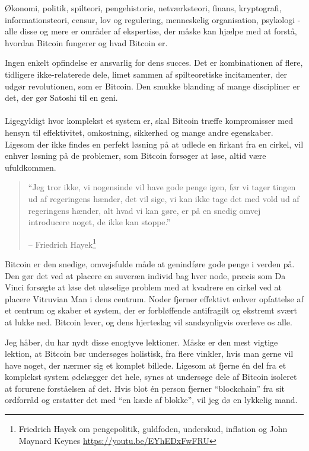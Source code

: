 Økonomi, politik, spilteori, pengehistorie, netværksteori, finans, kryptografi, 
informationsteori, censur, lov og regulering, menneskelig organisation, 
psykologi - alle disse og mere er områder af ekspertise, der måske kan hjælpe 
med at forstå, hvordan Bitcoin fungerer og hvad Bitcoin er.

Ingen enkelt opfindelse er ansvarlig for dens succes. Det er kombinationen af 
flere, tidligere ikke-relaterede dele, limet sammen af spilteoretiske 
incitamenter, der udgør revolutionen, som er Bitcoin. Den smukke blanding af 
mange discipliner er det, der gør Satoshi til en geni.

\paragraph{} Ligegyldigt hvor komplekst et system er, skal Bitcoin træffe 
kompromisser med hensyn til effektivitet, omkostning, sikkerhed og mange andre 
egenskaber. Ligesom der ikke findes en perfekt løsning på at udlede en firkant 
fra en cirkel, vil enhver løsning på de problemer, som Bitcoin forsøger at 
løse, altid være ufuldkommen.

\begin{quotation}\begin{samepage}
\enquote{Jeg tror ikke, vi nogensinde vil have gode penge igen, før vi tager
tingen ud af regeringens hænder, det vil sige, vi kan ikke tage det med
vold ud af regeringens hænder, alt hvad vi kan gøre, er på en snedig omvej
introducere noget, de ikke kan stoppe.}
\begin{flushright} -- Friedrich Hayek\footnote{Friedrich Hayek om pengepolitik, 
    guldfoden, underskud, inflation og John Maynard Keynes 
    \url{https://youtu.be/EYhEDxFwFRU}}
\end{flushright}\end{samepage}\end{quotation}

Bitcoin er den snedige, omvejsfulde måde at genindføre gode penge i verden på. 
Den gør det ved at placere en suveræn individ bag hver node, præcis som Da 
Vinci forsøgte at løse det uløselige problem med at kvadrere en cirkel ved at 
placere Vitruvian Man i dens centrum. Noder fjerner effektivt enhver opfattelse 
af et centrum og skaber et system, der er forbløffende antifragilt og ekstremt 
svært at lukke ned. Bitcoin lever, og dens hjerteslag vil sandsynligvis 
overleve os alle.

Jeg håber, du har nydt disse enogtyve lektioner. Måske er den mest vigtige 
lektion, at Bitcoin bør undersøges holistisk, fra flere vinkler, hvis man gerne 
vil have noget, der nærmer sig et komplet billede. Ligesom at fjerne én del 
fra et komplekst system ødelægger det hele, synes at undersøge dele af Bitcoin 
isoleret at forurene forståelsen af det. Hvis blot én person fjerner 
\enquote{blockchain} fra sit ordforråd og erstatter det med 
\enquote{en kæde af blokke}, vil jeg dø en lykkelig mand.

